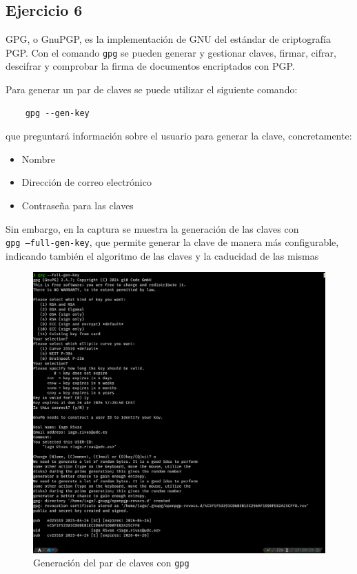 \subsection{Ejercicio 6}
\graphicspath{ {img/06} }

GPG, o GnuPGP, es la implementación de GNU del estándar de criptografía PGP. Con el comando \texttt{gpg} se pueden generar y gestionar claves, firmar, cifrar, descifrar y comprobar la firma de documentos encriptados con PGP.

Para generar un par de claves se puede utilizar el siguiente comando:
\begin{verbatim}
    gpg --gen-key
\end{verbatim}

que preguntará información sobre el usuario para generar la clave, concretamente:
\begin{itemize}
    \item{Nombre}
    \item{Dirección de correo electrónico}
    \item{Contraseña para las claves}
\end{itemize}

Sin embargo, en la captura se muestra la generación de las claves con \\ \texttt{gpg --full-gen-key}, que permite generar la clave de manera más configurable, indicando también el algoritmo de las claves y la caducidad de las mismas

\begin{figure}[H]
    \includegraphics[width=\textwidth]{gpg-genkey.png}
    \caption{Generación del par de claves con \texttt{gpg}}
\end{figure}

